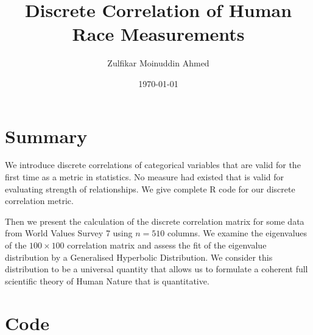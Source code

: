 \documentclass{amsart}
\title{Discrete Correlation of Human Race Measurements}
\author{Zulfikar Moinuddin Ahmed}
\date{\today}
\begin{document}
\maketitle

\section{Summary}

We introduce discrete correlations of categorical variables that are valid for the first time as a metric in statistics.  No measure had existed that is valid for evaluating strength of relationships.  We give complete R code for our discrete correlation metric.

Then we present the calculation of the discrete correlation matrix for some data from World Values Survey 7 using $n=510$ columns.  We examine the eigenvalues of the $100 \times 100$ correlation matrix and assess the fit of the eigenvalue distribution by a Generalised Hyperbolic Distribution.  We consider this distribution to be a universal quantity that allows us to formulate a coherent full scientific theory of Human Nature that is quantitative.



\section{Code}
\end{document}
